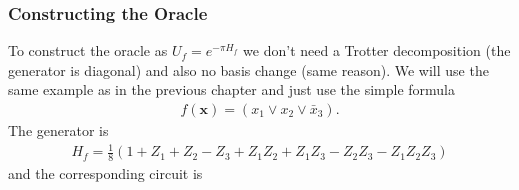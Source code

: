 \subsubsection*{Constructing the Oracle}
To construct the oracle as $U_f = e^{-\pi H_f}$ we don't need a Trotter decomposition (the generator is diagonal) and also no basis change (same reason). 
We will use the same example as in the previous chapter and just use the simple formula
\begin{align}
    f(\mathbf{x}) = (x_1\vee x_2\vee \bar{x}_3).
\end{align}
The generator is
\begin{align}
    H_f = \frac{1}{8}\left(1 + Z_1 + Z_2 - Z_3 + Z_1Z_2 + Z_1Z_3 - Z_2Z_3 - Z_1Z_2Z_3\right)
\end{align}
and the corresponding circuit is 
\begin{center} 
\end{center}

